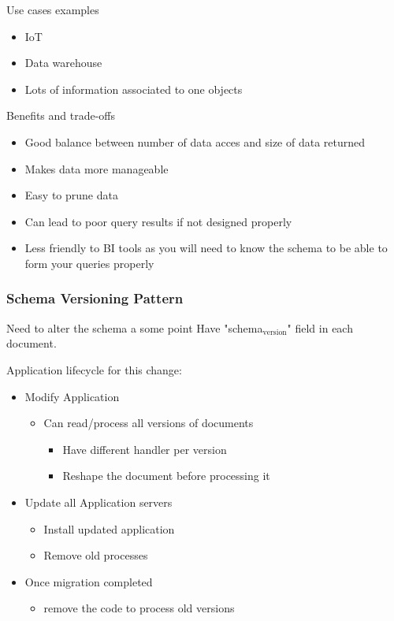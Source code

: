 \documentclass[11pt]{article}
\begin{document}
Use cases examples
\begin{itemize}
\item IoT
\item Data warehouse
\item Lots of information associated to one objects
\end{itemize}

Benefits and trade-offs
\begin{itemize}
\item Good balance between number of data acces and size of data returned
\item Makes data more manageable
\item Easy to prune data
\item Can lead to poor query results if not designed properly
\item Less friendly to BI tools as you will need to know the schema to be able to form your queries properly
\end{itemize}

\subsubsection{Schema Versioning Pattern}
\label{sec:orgbb62744}
Need to alter the schema a some point
Have "schema\(_{\text{version}}\)" field in each document.

Application lifecycle for this change:
\begin{itemize}
\item Modify Application
\begin{itemize}
\item Can read/process all versions of documents
\begin{itemize}
\item Have different handler per version
\item Reshape the document before processing it
\end{itemize}
\end{itemize}
\item Update all Application servers
\begin{itemize}
\item Install updated application
\item Remove old processes
\end{itemize}
\item Once migration completed
\begin{itemize}
\item remove the code to process old versions
\end{itemize}
\end{itemize}
\end{document}
